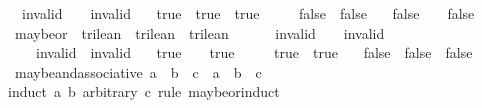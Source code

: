 \begin{isabellebody}
\ \ {\isachardoublequoteopen}invalid\ {\isasymand}\isactrlsub {\isacharquery}\ {\isacharunderscore}\ {\isacharequal}\ invalid{\isachardoublequoteclose}\ {\isacharbar}\isanewline
\ \ {\isachardoublequoteopen}true\ {\isasymand}\isactrlsub {\isacharquery}\ true\ {\isacharequal}\ true{\isachardoublequoteclose}\ {\isacharbar}\isanewline
\ \ {\isachardoublequoteopen}{\isacharunderscore}\ {\isasymand}\isactrlsub {\isacharquery}\ false\ {\isacharequal}\ false{\isachardoublequoteclose}\ {\isacharbar}\isanewline
\ \ {\isachardoublequoteopen}false\ {\isasymand}\isactrlsub {\isacharquery}\ {\isacharunderscore}\ {\isacharequal}\ false{\isachardoublequoteclose}\ \isanewline
\isanewline
{}\isamarkupfalse%
\ maybe{\isacharunderscore}or\ {\isacharcolon}{\isacharcolon}\ {\isachardoublequoteopen}trilean\ {\isasymRightarrow}\ trilean\ {\isasymRightarrow}\ trilean{\isachardoublequoteclose}\ {\isacharparenleft}\ {\isachardoublequoteopen}{\isasymor}\isactrlsub {\isacharquery}{\isachardoublequoteclose}\ {}{}{\isacharparenright}\ \isanewline
\ \ {\isachardoublequoteopen}invalid\ {\isasymor}\isactrlsub {\isacharquery}\ {\isacharunderscore}\ {\isacharequal}\ invalid{\isachardoublequoteclose}\ {\isacharbar}\isanewline
\ \ {\isachardoublequoteopen}{\isacharunderscore}\ {\isasymor}\isactrlsub {\isacharquery}\ invalid\ {\isacharequal}\ invalid{\isachardoublequoteclose}\ {\isacharbar}\isanewline
\ \ {\isachardoublequoteopen}true\ {\isasymor}\isactrlsub {\isacharquery}\ {\isacharunderscore}\ {\isacharequal}\ true{\isachardoublequoteclose}\ {\isacharbar}\isanewline
\ \ {\isachardoublequoteopen}{\isacharunderscore}\ {\isasymor}\isactrlsub {\isacharquery}\ true\ {\isacharequal}\ true{\isachardoublequoteclose}\ {\isacharbar}\isanewline
\ \ {\isachardoublequoteopen}false\ {\isasymor}\isactrlsub {\isacharquery}\ false\ {\isacharequal}\ false{\isachardoublequoteclose}\isanewline
\isanewline
\isanewline
{}\isamarkupfalse%
\ maybe{\isacharunderscore}and{\isacharunderscore}associative{\isacharcolon}\ {\isachardoublequoteopen}a\ {\isasymand}\isactrlsub {\isacharquery}\ b\ {\isasymand}\isactrlsub {\isacharquery}\ c\ {\isacharequal}\ a\ {\isasymand}\isactrlsub {\isacharquery}\ {\isacharparenleft}b\ {\isasymand}\isactrlsub {\isacharquery}\ c{\isacharparenright}{\isachardoublequoteclose}\isanewline
%
\isadelimproof
%
\endisadelimproof
%
\isatagproof
{}\isamarkupfalse%
{\isacharparenleft}induct\ a\ b\ arbitrary{\isacharcolon}\ c\ rule{\isacharcolon}\ maybe{\isacharunderscore}or{\isachardot}induct{\isacharparenright}\isanewline

\end{isabellebody}
